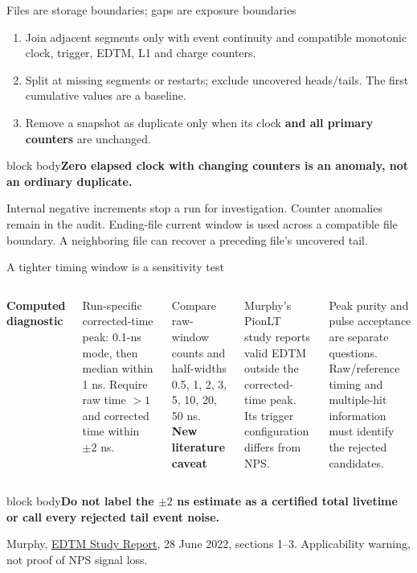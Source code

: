 \documentclass[aspectratio=169,11pt]{beamer}
\newcommand{\source}[1]{\par\vfill{\scriptsize\color{muted}#1\par}}
\newcommand{\takeaway}[1]{\begin{beamercolorbox}[sep=2.5mm,wd=\linewidth]{block body}\textbf{#1}\end{beamercolorbox}}
\begin{document}
\begin{frame}{Files are storage boundaries; gaps are exposure boundaries}
\begin{enumerate}\setlength\itemsep{3mm}
\item Join adjacent segments only with event continuity and compatible monotonic clock, trigger, EDTM, L1 and charge counters.
\item Split at missing segments or restarts; exclude uncovered heads/tails. The first cumulative values are a baseline.
\item Remove a snapshot as duplicate only when its clock \textbf{and all primary counters} are unchanged.
\end{enumerate}
\vspace{2mm}\takeaway{Zero elapsed clock with changing counters is an anomaly, not an ordinary duplicate.}
\source{Internal negative increments stop a run for investigation. Counter anomalies remain in the audit. Ending-file current window is used across a compatible file boundary. A neighboring file can recover a preceding file's uncovered tail.}
\end{frame}

\begin{frame}{A tighter timing window is a sensitivity test}
\begin{columns}[T]
\textbf{Computed diagnostic}
\small\par Run-specific corrected-time peak: 0.1-ns mode, then median within 1 ns. Require raw time $>1$ and corrected time within $\pm2$ ns.
\vspace{3mm}\par Compare raw-window counts and half-widths 0.5, 1, 2, 3, 5, 10, 20, 50 ns.
\textbf{New literature caveat}
\small\par Murphy's PionLT study reports valid EDTM outside the corrected-time peak. Its trigger configuration differs from NPS.
\vspace{3mm}\par Peak purity and pulse acceptance are separate questions. Raw/reference timing and multiple-hit information must identify the rejected candidates.
\end{columns}
\vspace{3mm}\takeaway{Do not label the $\pm2$ ns estimate as a certified total livetime or call every rejected tail event noise.}
\source{Murphy, \href{https://redmine.jlab.org/attachments/download/1499/EDTM_Study_Report.pdf}{EDTM Study Report}, 28 June 2022, sections 1--3. Applicability warning, not proof of NPS signal loss.}
\end{frame}
\end{document}

